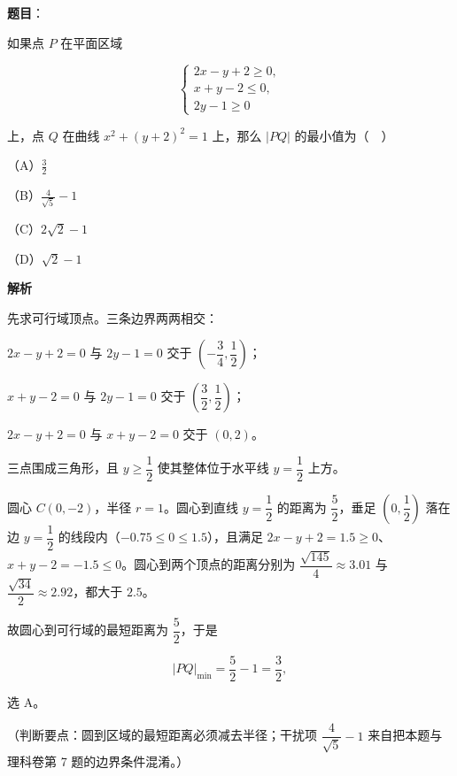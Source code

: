 \begin{answer}

\textbf{题目}：

如果点 $P$ 在平面区域

\nopagebreak[4]
\[\begin{cases}2x-y+2\geqslant 0,\\ x+y-2\leqslant 0,\\ 2y-1\geqslant 0\end{cases}\]

上，点 $Q$ 在曲线 $x^2+(y+2)^2=1$ 上，那么 $|PQ|$ 的最小值为（　）

（A）$\frac32$

（B）$\frac{4}{\sqrt5}-1$

（C）$2\sqrt2-1$

（D）$\sqrt2-1$

\textbf{解析}

先求可行域顶点。三条边界两两相交：

$2x-y+2=0$ 与 $2y-1=0$ 交于 $\left(-\dfrac34,\dfrac12\right)$；

$x+y-2=0$ 与 $2y-1=0$ 交于 $\left(\dfrac32,\dfrac12\right)$；

$2x-y+2=0$ 与 $x+y-2=0$ 交于 $(0,2)$。

三点围成三角形，且 $y\geqslant\dfrac12$ 使其整体位于水平线 $y=\dfrac12$ 上方。

圆心 $C(0,-2)$，半径 $r=1$。圆心到直线 $y=\dfrac12$ 的距离为 $\dfrac52$，垂足 $\left(0,\dfrac12\right)$ 落在边 $y=\dfrac12$ 的线段内（$-0.75\leqslant0\leqslant1.5$），且满足 $2x-y+2=1.5\geqslant0$、$x+y-2=-1.5\leqslant0$。圆心到两个顶点的距离分别为 $\dfrac{\sqrt{145}}{4}\approx3.01$ 与 $\dfrac{\sqrt{34}}{2}\approx2.92$，都大于 $2.5$。

故圆心到可行域的最短距离为 $\dfrac52$，于是

\nopagebreak[4]
\[|PQ|_{\min}=\frac52-1=\frac32,\]

选 A。

（判断要点：圆到区域的最短距离必须减去半径；干扰项 $\dfrac{4}{\sqrt5}-1$ 来自把本题与理科卷第 7 题的边界条件混淆。）


\end{answer}
